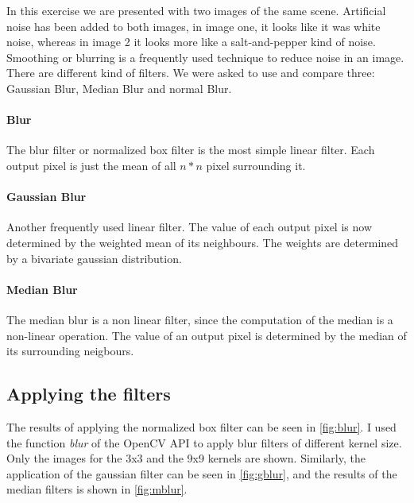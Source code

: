 \documentclass[11pt,a4paper]{article}
\begin{document}
In this exercise we are presented with two images of the same scene. Artificial noise has been added to both images, in image one, it looks like it was white noise, whereas in image 2 it looks more like a salt-and-pepper kind of noise. Smoothing or blurring is a frequently used technique to reduce noise in an image. There are different kind of filters. We were asked to use and compare three: Gaussian Blur, Median Blur and normal Blur.
\paragraph{Blur}
The blur filter or normalized box filter is the most simple linear filter. Each output pixel is just the mean of all $n*n$ pixel surrounding it.
\paragraph{Gaussian Blur}
Another frequently used linear filter. The value of each output pixel is now determined by the weighted mean of its neighbours. The weights are determined by a bivariate gaussian distribution.
\paragraph{Median Blur}
The median blur is a non linear filter, since the computation of the median is a non-linear operation. The value of an output pixel is determined by the median of its surrounding neigbours.

\subsection{Applying the filters}
The results of applying the normalized box filter can be seen in \ref{fig:blur}. I used the function \textit{blur} of the OpenCV API to apply blur filters of different kernel size. Only the images for the 3x3 and the 9x9 kernels are shown. Similarly, the application of the gaussian filter can be seen in \ref{fig:gblur}, and the results of the median filters is shown in \ref{fig:mblur}.
\end{document}
